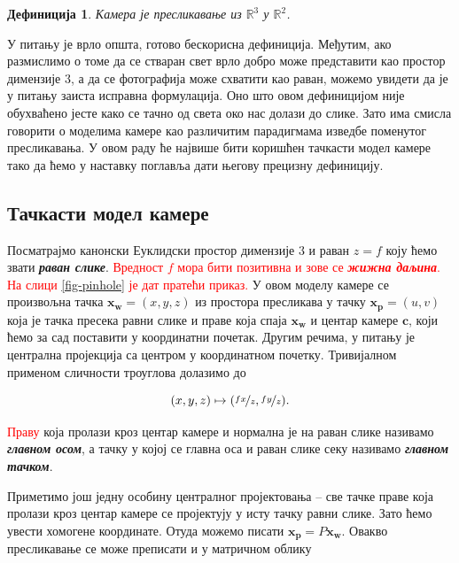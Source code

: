 \documentclass[12pt, a4paper, twoside]{book}
\numberwithin{equation}{chapter}
\numberwithin{theorem}{section}
\newtheorem{definition}{Дефиниција}
\numberwithin{definition}{section}
\numberwithin{definitionChapter}{chapter}
\begin{document}
\begin{definition}
	Камера је пресликавање из $\mathbb{R}^3$ у $\mathbb{R}^2$.
\end{definition}

У питању је врло општа, готово бескорисна дефиниција. Међутим, ако размислимо
о томе да се стваран свет врло добро може представити као простор димензије $3$,
а да се фотографија може схватити као раван, можемо увидети да је у питању заиста
исправна формулација. Оно што овом дефиницијом није обухваћено јесте како се тачно
од света око нас долази до слике. Зато има смисла говорити о моделима камере као
различитим парадигмама изведбе поменутог пресликавања. У овом раду ће највише
бити коришћен тачкасти модел камере тако да ћемо у наставку поглавља дати његову
прецизну дефиницију.
	
	\subsection{Тачкасти модел камере}
	Посматрајмо канонски Еуклидски простор димензије $3$ и раван $z=f$ коју ћемо звати
	\textbf{\textit{раван слике}}. \textcolor{red}{Вредност $f$ мора бити позитивна и зове се
	\textbf{\textit{жижна даљина}}.} \textcolor{red}{На слици \ref{fig-pinhole} је дат пратећи приказ.}
	У овом моделу камере се произвољна тачка $\mathbf{x_w}=(x, y, z)$ из простора
	пресликава у тачку $\mathbf{x_p}=(u,v)$ која је тачка пресека равни слике и праве која спаја $\mathbf{x_w}$
	и центар камере $\mathbf{c}$, који ћемо за сад поставити у координатни почетак.	Другим речима, у питању је централна
	пројекција са центром у координатном почетку. Тривијалном применом сличности троуглова долазимо до
	
	\begin{equation}
		(x, y, z) \mapsto (\nicefrac{fx}{z}, \nicefrac{fy}{z}).
	\end{equation}

	\textcolor{red}{Праву} која пролази кроз центар камере и нормална је на раван слике називамо \textbf{\textit{главном осом}},
	а тачку у којој се главна оса и раван слике секу називамо \textbf{\textit{главном тачком}}.
	
	Приметимо још једну особину централног пројектовања -- све тачке праве која пролази кроз центар
	камере се пројектују у исту тачку равни слике. Зато ћемо увести хомогене координате. Отуда
	можемо писати $\mathbf{x_p} = P\mathbf{x_w}$. Овакво пресликавање се може преписати и у
	матричном облику
	
\end{document}
